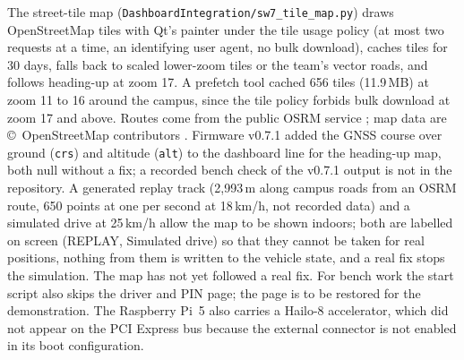 The street-tile map (\texttt{DashboardIntegration/\allowbreak{}sw7\_\allowbreak{}tile\_\allowbreak{}map.py}) draws OpenStreetMap tiles with Qt's painter under the tile usage policy (at most two requests at a time, an identifying user agent, no bulk download), caches tiles for 30 days, falls back to scaled lower-zoom tiles or the team's vector roads, and follows heading-up at zoom 17. A prefetch tool cached 656 tiles (11.9\,MB) at zoom 11 to 16 around the campus, since the tile policy forbids bulk download at zoom 17 and above. Routes come from the public OSRM service \cite{luxen2011osrm}; map data are \copyright\ OpenStreetMap contributors \cite{osm}. Firmware v0.7.1 added the GNSS course over ground (\texttt{crs}) and altitude (\texttt{alt}) to the dashboard line for the heading-up map, both null without a fix; a recorded bench check of the v0.7.1 output is not in the repository. A generated replay track (2,993\,m along campus roads from an OSRM route, 650 points at one per second at 18\,km/h, not recorded data) and a simulated drive at 25\,km/h allow the map to be shown indoors; both are labelled on screen (REPLAY, Simulated drive) so that they cannot be taken for real positions, nothing from them is written to the vehicle state, and a real fix stops the simulation. The map has not yet followed a real fix. For bench work the start script also skips the driver and PIN page; the page is to be restored for the demonstration. The Raspberry Pi~5 also carries a Hailo-8 accelerator, which did not appear on the PCI Express bus because the external connector is not enabled in its boot configuration.
